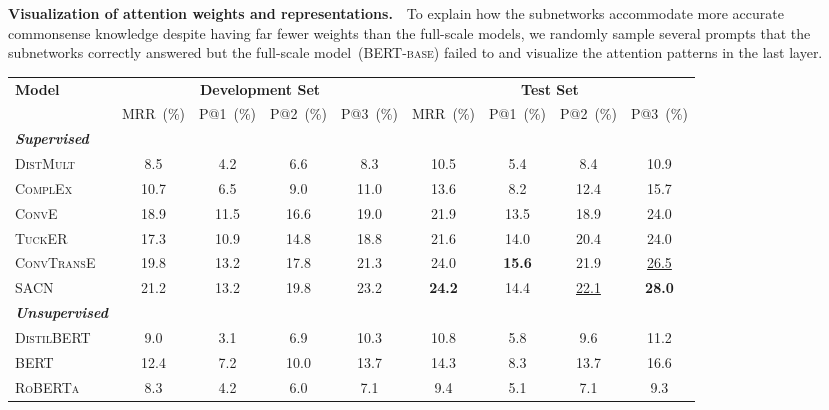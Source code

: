 \noindent
\textbf{Visualization of attention weights and representations.}~~To explain 
how the subnetworks accommodate more accurate commonsense knowledge despite 
having far fewer weights than the full-scale models, we randomly 
sample several prompts that the subnetworks correctly answered but 
the full-scale model~(\textsc{BERT-base}) failed to and 
visualize the attention patterns in the last layer.
\begin{table}[t!]
	\centering
	\scriptsize
	\begin{tabular}{l|cccc|cccc}
		\toprule
		\multirow{2}{*}{\textbf{Model}} & \multicolumn{4}{c|}{\textbf{Development Set}} &\multicolumn{4}{c}{\textbf{Test Set}}  \\
		
		&MRR~(\%)   &P@1~(\%)  &P@2~(\%)  &P@3~(\%)  &MRR~(\%)   &P@1~(\%)  &P@2~(\%)  &P@3~(\%)  \\
		\cline{1-9}
		\textbf{\textit{Supervised}} & & & & & & & &\\
		\cline{1-9}
		\textsc{DistMult}~\citep{yang2015embedding} &8.5   &4.2  &6.6  &8.3  &10.5   &5.4  &8.4  &10.9  \\
		\textsc{ComplEx}~\citep{complex} &10.7   &6.5  &9.0  &11.0  &13.6   &8.2  &12.4  &15.7  \\
		\textsc{ConvE}~\citep{DBLP:journals/corr/DettmersMSR17} &18.9   &11.5  &16.6  &19.0  &21.9   &13.5  &18.9  &24.0  \\
		\textsc{TuckER}~\citep{DBLP:journals/corr/abs-1901-09590} &17.3   &10.9  &14.8  &18.8  &21.6   &14.0  &20.4  &24.0  \\
		\textsc{ConvTransE}~\citep{shang2019end-to-end} &19.8   &13.2  &17.8  &21.3  &24.0   &\textbf{15.6}  &21.9  &\underline{26.5}  \\
		\textsc{SACN}~\citep{shang2019end-to-end} &21.2   &13.2  &19.8  &23.2  &\textbf{24.2} &14.4  &\underline{22.1}  &\textbf{28.0}  \\
		\midrule
		\textbf{\textit{Unsupervised}} & & & & & & & &\\
		\cline{1-9}
		\textsc{DistilBERT} &9.0 &3.1 &6.9 &10.3 &10.8 &5.8 &9.6 &11.2 \\
		\textsc{BERT} &12.4 &7.2 &10.0 &13.7 &14.3 &8.3 &13.7 &16.6 \\
		\textsc{RoBERTa} &8.3 &4.2 &6.0 &7.1 &9.4 &5.1 &7.1 &9.3 \\

\end{tabular}
\end{table}
